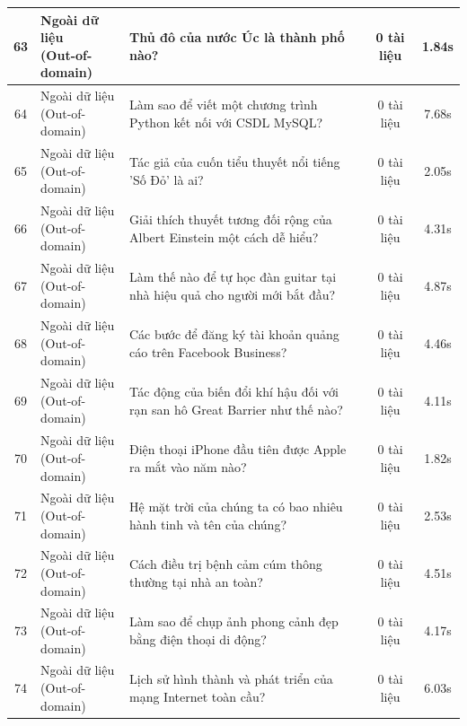 \begin{longtable}{|c|l|p{6.5cm}|c|c|}
63 & \makecell[l]{Ngoài dữ liệu\\(Out-of-domain)} & Thủ đô của nước Úc là thành phố nào? & 0 tài liệu & 1.84s \\ \hline
64 & \makecell[l]{Ngoài dữ liệu\\(Out-of-domain)} & Làm sao để viết một chương trình Python kết nối với CSDL MySQL? & 0 tài liệu & 7.68s \\ \hline
65 & \makecell[l]{Ngoài dữ liệu\\(Out-of-domain)} & Tác giả của cuốn tiểu thuyết nổi tiếng 'Số Đỏ' là ai? & 0 tài liệu & 2.05s \\ \hline
66 & \makecell[l]{Ngoài dữ liệu\\(Out-of-domain)} & Giải thích thuyết tương đối rộng của Albert Einstein một cách dễ hiểu? & 0 tài liệu & 4.31s \\ \hline
67 & \makecell[l]{Ngoài dữ liệu\\(Out-of-domain)} & Làm thế nào để tự học đàn guitar tại nhà hiệu quả cho người mới bắt đầu? & 0 tài liệu & 4.87s \\ \hline
68 & \makecell[l]{Ngoài dữ liệu\\(Out-of-domain)} & Các bước để đăng ký tài khoản quảng cáo trên Facebook Business? & 0 tài liệu & 4.46s \\ \hline
69 & \makecell[l]{Ngoài dữ liệu\\(Out-of-domain)} & Tác động của biến đổi khí hậu đối với rạn san hô Great Barrier như thế nào? & 0 tài liệu & 4.11s \\ \hline
70 & \makecell[l]{Ngoài dữ liệu\\(Out-of-domain)} & Điện thoại iPhone đầu tiên được Apple ra mắt vào năm nào? & 0 tài liệu & 1.82s \\ \hline
71 & \makecell[l]{Ngoài dữ liệu\\(Out-of-domain)} & Hệ mặt trời của chúng ta có bao nhiêu hành tinh và tên của chúng? & 0 tài liệu & 2.53s \\ \hline
72 & \makecell[l]{Ngoài dữ liệu\\(Out-of-domain)} & Cách điều trị bệnh cảm cúm thông thường tại nhà an toàn? & 0 tài liệu & 4.51s \\ \hline
73 & \makecell[l]{Ngoài dữ liệu\\(Out-of-domain)} & Làm sao để chụp ảnh phong cảnh đẹp bằng điện thoại di động? & 0 tài liệu & 4.17s \\ \hline
74 & \makecell[l]{Ngoài dữ liệu\\(Out-of-domain)} & Lịch sử hình thành và phát triển của mạng Internet toàn cầu? & 0 tài liệu & 6.03s \\ \hline

\end{longtable}
